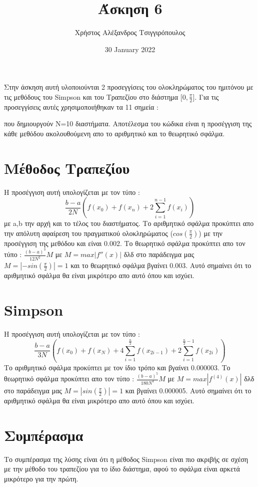 \documentclass{article}
\title{Άσκηση 6}
\author{Χρήστος Αλέξανδρος Τσιγγιρόπουλος}
\date{30 January 2022}
\begin{document}
    \maketitle
    Στην άσκηση αυτή υλοποιούνται 2 προσεγγίσεις του ολοκληρώματος του
    ημιτόνου με τις μεθόδους του Simpson και του Τραπεζίου στο διάστημα
    $[0,\frac{\pi}{2}$]. 
    Για τις προσεγγίσεις αυτές χρησιμοποιήθηκαν τα 11 σημεία :

    \begin{equation*}
        [0, \frac{\pi}{20}, \frac{\pi}{10},...,\frac{9\pi}{20}, \frac{\pi}{2}]
    \end{equation*}
    που δημιουργούν N=10 διαστήματα. Αποτέλεσμα του κώδικα είναι η προσέγγιση
    της κάθε μεθόδου ακολουθούμενη απο το αριθμητικό και το θεωρητικό σφάλμα.

    \section{Μέθοδος Τραπεζίου}
    Η προσέγγιση αυτή υπολογίζεται με τον τύπο :
    \begin{equation*}
        \frac{b-a}{2N}(f(x_0) + f(x_n) + 2 \sum_{i=1}^{n-1} f(x_i))
    \end{equation*}
    με a,b την αρχή και το τέλος του διαστήματος.
    Το αριθμητικό σφάλμα προκύπτει απο την απόλυτη αφαίρεση του πραγματικού 
    ολοκληρώματος ($cos(\frac{\pi}{2})$) με την προσέγγιση της μεθόδου και είναι 0.002. 
    Το θεωρητικό σφάλμα προκύπτει απο τον τύπο : 
    $\frac{(b-a)^3}{12N^2} M$ με 
    $M=max{|f''(x)|}$ δλδ στο παράδειγμα 
    μας $M=|-sin(\frac{\pi}{2})| = 1$ και το θεωρητικό σφάλμα βγαίνει 
    0.003. Αυτό σημαίνει ότι το αριθμητικό σφάλμα θα είναι μικρότερο απο αυτό όπου και ισχύει.
    
    \section{Simpson}
    Η προσέγγιση αυτή υπολογίζεται με τον τύπο :
    \begin{equation*}
        \frac{b-a}{3N}(f(x_0) + f(x_N) + 4 \sum_{i=1}^{\frac{n}{2}} f(x_{2i-1}) + 2 \sum_{i=1}^{\frac{n}{2}-1} f(x_{2i}))
    \end{equation*}
    Το αριθμητικό σφάλμα προκύπτει με τον ίδιο τρόπο και βγαίνει 0.000003.
    Το θεωρητικό σφάλμα προκύπτει απο τον τύπο : 
    $\frac{(b-a)^5}{180N^4} M$ με 
    $M=max{|f^{(4)}(x)|}$ δλδ στο παράδειγμα 
    μας $M=|sin(\frac{\pi}{2})| = 1$ και βγαίνει 
    0.000005. Αυτό σημαίνει ότι το αριθμητικό σφάλμα θα είναι μικρότερο απο αυτό όπου και ισχύει.
    
    
    \section{Συμπέρασμα}
    Το συμπέρασμα της λύσης είναι ότι η μέθοδος Simpson είναι πιο ακριβής σε σχέση 
    με την μέθοδο του τραπεζίου για το ίδιο διάστημα, αφού το σφάλμα είναι αρκετά μικρότερο για την πρώτη.
    

    
    
\end{document}
